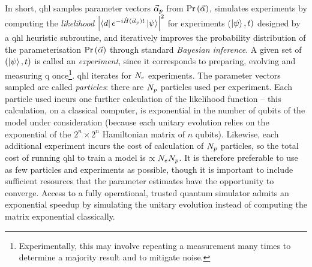 In short, \gls{qhl} samples parameter vectors $\vec{\alpha}_p$ from $\Pr\left(\vec{\alpha}\right)$, 
    simulates experiments by computing the \emph{likelihood} $\left| \bra{d} e^{-i \hat{H}(\vec{\alpha}_p)t} \ket{\psi} \right|^2$
    for experiments ($\ket{\psi}, t)$ designed by a \gls{qhl} heuristic subroutine, 
    and iteratively improves the probability distribution of the parameterisation $\Pr\left(\vec{\alpha}\right)$ 
    through standard \emph{Bayesian inference}. 
A given set of $(\ket{\psi}, t)$ is called an \emph{experiment}, since it corresponds to preparing, evolving and measuring \gls{q} 
once\footnote{Experimentally, this may involve repeating a measurement many times to determine a majority result and to mitigate noise.}. 
\gls{qhl} iterates for $N_e$ experiments. 
The parameter vectors sampled are called \emph{particles}: there are $N_p$ particles used per experiment. 
Each particle used incurs one further calculation of the \gls{likelihood} function -- 
    this calculation, on a classical computer, is exponential in the number of qubits of the model under consideration
    (because each unitary evolution relies on the exponential of the $2^n \times 2^n$ Hamiltonian matrix of $n$ qubits). 
Likewise, each additional experiment incurs the cost of calculation of $N_p$ particles, 
    so the total cost of running \gls{qhl} to train a model is $\propto N_e N_p$.
It is therefore preferable to use as few particles and experiments as possible, 
    though it is important to include sufficient resources that the parameter estimates have the opportunity to converge. 
Access to a fully operational, trusted quantum simulator admits an exponential 
    speedup by simulating the unitary evolution instead of computing the matrix exponential classically.
\par 

